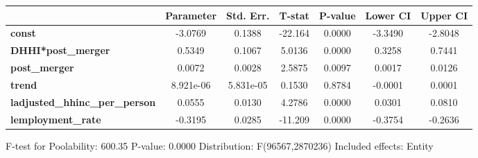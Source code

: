 \documentclass{report}
\begin{document}
\begin{center}
\begin{tabular}{lclc}
\bottomrule
\end{tabular}
\begin{tabular}{lcccccc}
                                       & \textbf{Parameter} & \textbf{Std. Err.} & \textbf{T-stat} & \textbf{P-value} & \textbf{Lower CI} & \textbf{Upper CI}  \\
\midrule
\textbf{const}                         &      -3.0769       &       0.1388       &     -22.164     &      0.0000      &      -3.3490      &      -2.8048       \\
\textbf{DHHI*post\_merger}             &       0.5349       &       0.1067       &      5.0136     &      0.0000      &       0.3258      &       0.7441       \\
\textbf{post\_merger}                  &       0.0072       &       0.0028       &      2.5875     &      0.0097      &       0.0017      &       0.0126       \\
\textbf{trend}                         &     8.921e-06      &     5.831e-05      &      0.1530     &      0.8784      &      -0.0001      &       0.0001       \\
\textbf{ladjusted\_hhinc\_per\_person} &       0.0555       &       0.0130       &      4.2786     &      0.0000      &       0.0301      &       0.0810       \\
\textbf{lemployment\_rate}             &      -0.3195       &       0.0285       &     -11.209     &      0.0000      &      -0.3754      &      -0.2636       \\
\bottomrule
\end{tabular}
\end{center}

F-test for Poolability: 600.35 \newline
 P-value: 0.0000 \newline
 Distribution: F(96567,2870236) \newline
  \newline
 Included effects: Entity
\end{document}
